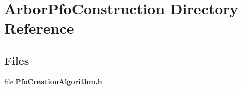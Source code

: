 \section{Arbor\+Pfo\+Construction Directory Reference}
\label{dir_7b17ef8ed6a064e521784511c3298cbc}
\subsection*{Files}
\begin{DoxyCompactItemize}
\item 
file {\bf Pfo\+Creation\+Algorithm.\+h}
\end{DoxyCompactItemize}
